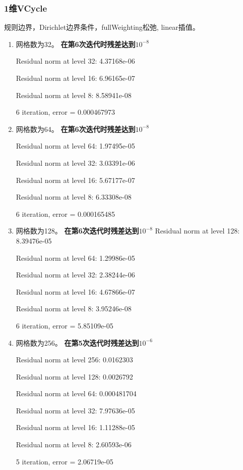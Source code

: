 \documentclass[UTF8]{ctexart}
\begin{document}
\subsubsection*{1维VCycle}
规则边界，Dirichlet边界条件，fullWeighting松弛, linear插值。
\begin{enumerate}
\item 网格数为32。
    \textbf{在第6次迭代时残差达到$10^{-8}$}

    Residual norm at level 32: 4.37168e-06

    Residual norm at level 16: 6.96165e-07

    Residual norm at level 8: 8.58941e-08

    6 iteration, error = 0.000467973

\item 网格数为64。
    \textbf{在第6次迭代时残差达到$10^{-8}$}

    Residual norm at level 64: 1.97495e-05

    Residual norm at level 32: 3.03391e-06

    Residual norm at level 16: 5.67177e-07

    Residual norm at level 8: 6.33308e-08

    6 iteration, error = 0.000165485



\item 网格数为128。
    \textbf{在第6次迭代时残差达到$10^{-8}$}
    Residual norm at level 128: 8.39476e-05

    Residual norm at level 64: 1.29986e-05

    Residual norm at level 32: 2.38244e-06

    Residual norm at level 16: 4.67866e-07

    Residual norm at level 8: 3.95246e-08

    6 iteration, error = 5.85109e-05

\item 网格数为256。
    \textbf{在第5次迭代时残差达到$10^{-6}$}

    Residual norm at level 256: 0.0162303

    Residual norm at level 128: 0.0026792

    Residual norm at level 64: 0.000481704

    Residual norm at level 32: 7.97636e-05

    Residual norm at level 16: 1.11288e-05

    Residual norm at level 8: 2.60593e-06

    5 iteration, error = 2.06719e-05

\end{enumerate}
\end{document}
